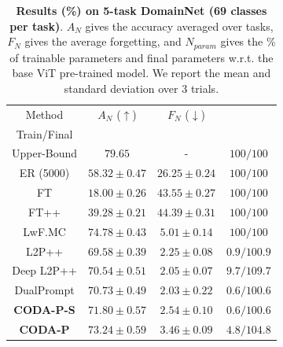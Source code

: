 \begin{table}[t]
\caption{\textbf{Results (\%) on 5-task DomainNet (69 classes per task)}. $A_N$ gives the accuracy averaged over tasks, $F_N$ gives the average forgetting, and $N_{param}$ gives the \% of trainable parameters and final parameters w.r.t. the base ViT pre-trained model. We report the mean and standard deviation over 3 trials.}
\vspace{-2mm}
\centering
\label{tab_2:domainnet}
\begin{tabular}{c||c|c|c} 
\hline
\rule{0pt}{10pt} Method  & $A_N$ ($\uparrow$) & $F_N$ ($\downarrow$) & \thead{$N_{param}$ ($\downarrow$) \\ Train/Final}\\
\hline
Upper-Bound  & $79.65$ & - & $100/100$  \\ 
\hline
ER (5000)    & $58.32 \pm 0.47$ & $26.25 \pm 0.24$ & $100/100$  \\
FT           & $18.00 \pm 0.26$ & $43.55 \pm 0.27$ & $100/100$  \\ 
FT++         & $39.28 \pm 0.21$ & $44.39 \pm 0.31$ & $100/100$ \\
LwF.MC       & $\bm{74.78 \pm 0.43}$ & $5.01 \pm 0.14$ & $100/100$  \\
L2P++        & $69.58 \pm 0.39$ & $2.25 \pm 0.08$ & $ 0.9/100.9$  \\
Deep L2P++   & $70.54 \pm 0.51$ & $2.05 \pm 0.07$ & $ 9.7/109.7$  \\  
DualPrompt   & $70.73 \pm 0.49$ & $\bm{2.03 \pm 0.22}$ & $ 0.6/100.6$  \\
\hdashline
\textbf{CODA-P-S}    & $71.80 \pm 0.57$ & $2.54 \pm 0.10$ & $ 0.6/100.6$  \\
\textbf{CODA-P}      & $73.24 \pm 0.59$ & $3.46 \pm 0.09$ & $ 4.8/104.8$  \\

\hline
\end{tabular}

\vspace{9mm}


\end{table}
